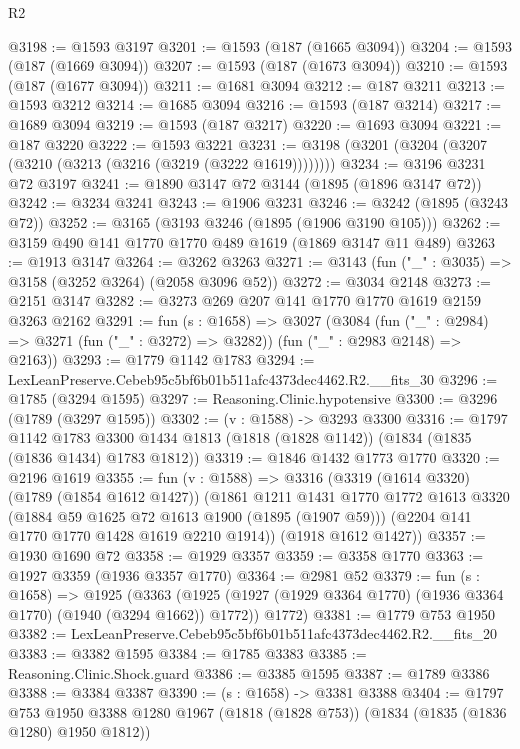 \begin{lexlean}{R2}
\begin{coremodule}
@3198 := @1593 @3197
@3201 := @1593 (@187 (@1665 @3094))
@3204 := @1593 (@187 (@1669 @3094))
@3207 := @1593 (@187 (@1673 @3094))
@3210 := @1593 (@187 (@1677 @3094))
@3211 := @1681 @3094
@3212 := @187 @3211
@3213 := @1593 @3212
@3214 := @1685 @3094
@3216 := @1593 (@187 @3214)
@3217 := @1689 @3094
@3219 := @1593 (@187 @3217)
@3220 := @1693 @3094
@3221 := @187 @3220
@3222 := @1593 @3221
@3231 := @3198 (@3201 (@3204 (@3207 (@3210 (@3213 (@3216 (@3219 (@3222 @1619))))))))
@3234 := @3196 @3231 @72 @3197
@3241 := @1890 @3147 @72 @3144 (@1895 (@1896 @3147 @72))
@3242 := @3234 @3241
@3243 := @1906 @3231
@3246 := @3242 (@1895 (@3243 @72))
@3252 := @3165 (@3193 @3246 (@1895 (@1906 @3190 @105)))
@3262 := @3159 @490 @141 @1770 @1770 @489 @1619 (@1869 @3147 @11 @489)
@3263 := @1913 @3147
@3264 := @3262 @3263
@3271 := @3143 (fun ("_" : @3035) => @3158 (@3252 @3264) (@2058 @3096 @52))
@3272 := @3034 @2148
@3273 := @2151 @3147
@3282 := @3273 @269 @207 @141 @1770 @1770 @1619 @2159 @3263 @2162
@3291 := fun (s : @1658) =>
  @3027
    (@3084
      (fun ("_" : @2984) => @3271 (fun ("_" : @3272) => @3282))
      (fun ("_" : @2983 @2148) => @2163))
@3293 := @1779 @1142 @1783
@3294 := LexLeanPreserve.Cebeb95c5bf6b01b511afc4373dec4462.R2.__fits_30
@3296 := @1785 (@3294 @1595)
@3297 := Reasoning.Clinic.hypotensive
@3300 := @3296 (@1789 (@3297 @1595))
@3302 := (v : @1588) -> @3293 @3300
@3316 := @1797
    @1142
    @1783
    @3300
    @1434
    @1813
    (@1818 (@1828 @1142))
    (@1834 (@1835 (@1836 @1434) @1783 @1812))
@3319 := @1846 @1432 @1773 @1770
@3320 := @2196 @1619
@3355 := fun (v : @1588) =>
  @3316
    (@3319
      (@1614 @3320)
      (@1789 (@1854 @1612 @1427))
      (@1861
        @1211
        @1431
        @1770
        @1772
        @1613
        @3320
        (@1884 @59 @1625 @72 @1613 @1900 (@1895 (@1907 @59)))
        (@2204 @141 @1770 @1770 @1428 @1619 @2210 @1914))
      (@1918 @1612 @1427))
@3357 := @1930 @1690 @72
@3358 := @1929 @3357
@3359 := @3358 @1770
@3363 := @1927 @3359 (@1936 @3357 @1770)
@3364 := @2981 @52
@3379 := fun (s : @1658) =>
  @1925
    (@3363
      (@1925 (@1927 (@1929 @3364 @1770) (@1936 @3364 @1770) (@1940 (@3294 @1662)) @1772))
      @1772)
@3381 := @1779 @753 @1950
@3382 := LexLeanPreserve.Cebeb95c5bf6b01b511afc4373dec4462.R2.__fits_20
@3383 := @3382 @1595
@3384 := @1785 @3383
@3385 := Reasoning.Clinic.Shock.guard
@3386 := @3385 @1595
@3387 := @1789 @3386
@3388 := @3384 @3387
@3390 := (s : @1658) -> @3381 @3388
@3404 := @1797
    @753
    @1950
    @3388
    @1280
    @1967
    (@1818 (@1828 @753))
    (@1834 (@1835 (@1836 @1280) @1950 @1812))

\end{coremodule}
\end{lexlean}
